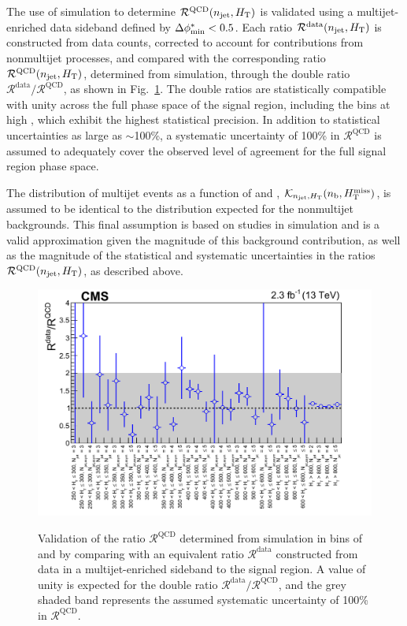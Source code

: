 The use of simulation to determine $\mathcal{R}^\mathrm{QCD}(n_{\text{jet}},
H_{\mathrm{T}})$ is validated using a multijet-enriched data sideband defined
by $\Delta\phi^{*}_\text{min} < 0.5$. Each ratio $\mathcal{R}^\text{data}(n_{\text{jet}},
H_{\mathrm{T}})$ is constructed from data counts, corrected to account for
contributions from nonmultijet processes, and compared with the
corresponding ratio $\mathcal{R}^\mathrm{QCD}(n_{\text{jet}}, H_{\mathrm{T}})$,
determined from simulation, through the double ratio
$\mathcal{R}^\text{data}/\mathcal{R}^\mathrm{QCD}$, as shown in
Fig.~\ref{fig:qcd}. The double ratios are statistically compatible
with unity across the full phase space of the signal region, including
the bins at high \scalht, which exhibit the highest statistical
precision. In addition to statistical uncertainties as large as
$\sim$100\%, a systematic uncertainty of 100\% in
$\mathcal{R}^\mathrm{QCD}$ is assumed to adequately cover the observed
level of agreement for the full signal region phase space. 

The distribution of multijet events as a function of \nb and \HTmiss,
$\mathcal{K}_{n_{\text{jet}}, H_{\mathrm{T}}}( n_{\text{b}}, H_{\mathrm{T}}^{\text{miss}} )$, is assumed to be
identical to the distribution expected for the nonmultijet
backgrounds. This final assumption is based on studies in simulation
and is a valid approximation given the magnitude of this background
contribution, as well as the magnitude of the statistical and
systematic uncertainties in the ratios
$\mathcal{R}^\mathrm{QCD}(n_{\text{jet}}, H_{\mathrm{T}})$, as described above.
 
\begin{figure}[!thb]
  \centering
    \includegraphics[width=\cmsFigWidthTwo]{Figure_002.pdf} \\
  \caption{Validation of the ratio $\mathcal{R}^\mathrm{QCD}$ determined
    from simulation in bins of \njet and \scalht [\GeVns{}] by comparing
    with an equivalent ratio $\mathcal{R}^\text{data}$ constructed
    from data in a multijet-enriched sideband to the signal region. A
    value of unity is expected for the double ratio
    $\mathcal{R}^\text{data} / \mathcal{R}^\mathrm{QCD}$, and the grey
    shaded band represents the assumed systematic uncertainty of 100\%
    in $\mathcal{R}^\mathrm{QCD}$.  }
  \label{fig:qcd}
\end{figure}


